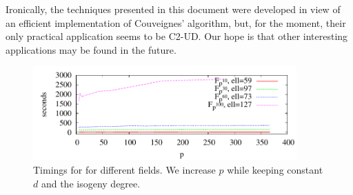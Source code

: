   Ironically, the
techniques presented in this document were developed in view of an
efficient implementation of Couveignes' algorithm, but, for the
moment, their only practical application seems to be C2-UD. Our hope
is that other interesting applications may be found in the future.

\begin{figure}
  \centering
  \includegraphics[width=0.9\textwidth]{isogeny/LSp}
  \caption{Timings for  for different fields. We
    increase $p$ while keeping constant $d$ and the isogeny degree.}
  \label{fig:LSp}
\end{figure}


%
